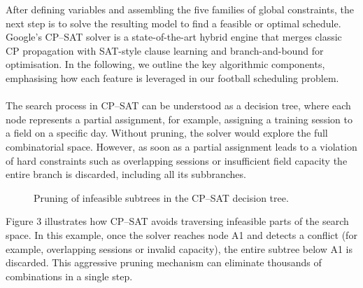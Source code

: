 \documentclass[12pt]{article}
\begin{document}
After defining variables and assembling the five families of global constraints, the next step is to solve the resulting model to find a feasible or optimal schedule. Google’s CP–SAT solver is a state-of-the-art hybrid engine that merges classic CP propagation with SAT-style clause learning and branch-and-bound for optimisation. In the following, we outline the key algorithmic components, emphasising how each feature is leveraged in our football scheduling problem.
\\
\\
The search process in CP–SAT can be understood as a decision tree, where each node represents a partial assignment, for example, assigning a training session to a field on a specific day. Without pruning, the solver would explore the full combinatorial space. However, as soon as a partial assignment leads to a violation of hard constraints such as overlapping sessions or insufficient field capacity the entire branch is discarded, including all its subbranches.

\begin{figure}[H]
\centering
{}
\caption{Pruning of infeasible subtrees in the CP–SAT decision tree.}
\end{figure}

Figure 3 illustrates how CP–SAT avoids traversing infeasible parts of the search space. In this example, once the solver reaches node A1 and detects a conflict (for example, overlapping sessions or invalid capacity), the entire subtree below A1 is discarded. This aggressive pruning mechanism can eliminate thousands of combinations in a single step.
\end{document}

